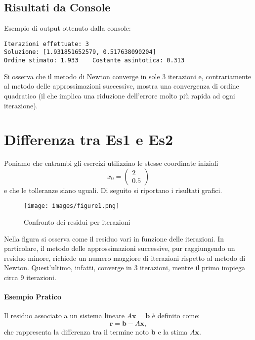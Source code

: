 \documentclass[11pt]{article}
\begin{document}
\subsection*{Risultati da Console}

Esempio di output ottenuto dalla console:
\begin{lstlisting}[style=console]
Iterazioni effettuate: 3 	 
Soluzione: [1.931851652579, 0.517638090204]
Ordine stimato: 1.933 	 Costante asintotica: 0.313
\end{lstlisting}

Si osserva che il metodo di Newton converge in sole 3 iterazioni e, contrariamente al metodo delle approssimazioni successive, mostra una convergenza di ordine quadratico (il che implica una riduzione dell'errore molto più rapida ad ogni iterazione).

\section*{Differenza tra Es1 e Es2}
Poniamo che entrambi gli esercizi utilizzino le stesse coordinate iniziali
\[
x_0=\begin{pmatrix} 2 \\ 0.5 \end{pmatrix}
\]
e che le tolleranze siano uguali. Di seguito si riportano i risultati grafici.

\begin{figure}[h]
  \centering
  \texttt{[image: images/figure1.png]} 
  \caption{Confronto dei residui per iterazioni}
  \label{fig:residui}
\end{figure}

Nella figura si osserva come il residuo vari in funzione delle iterazioni. In particolare, il metodo delle approssimazioni successive, pur raggiungendo un residuo minore, richiede un numero maggiore di iterazioni rispetto al metodo di Newton. Quest'ultimo, infatti, converge in 3 iterazioni, mentre il primo impiega circa 9 iterazioni.

\begin{mdframed}[linecolor=blue, linewidth=1pt, roundcorner=10pt]
\paragraph{Esempio Pratico}
Il residuo associato a un sistema lineare \(A\mathbf{x} = \mathbf{b}\) è definito come:
\[
\mathbf{r} = \mathbf{b} - A\mathbf{x},
\]
che rappresenta la differenza tra il termine noto \(\mathbf{b}\) e la stima \(A\mathbf{x}\).
\end{mdframed}
\end{document}

